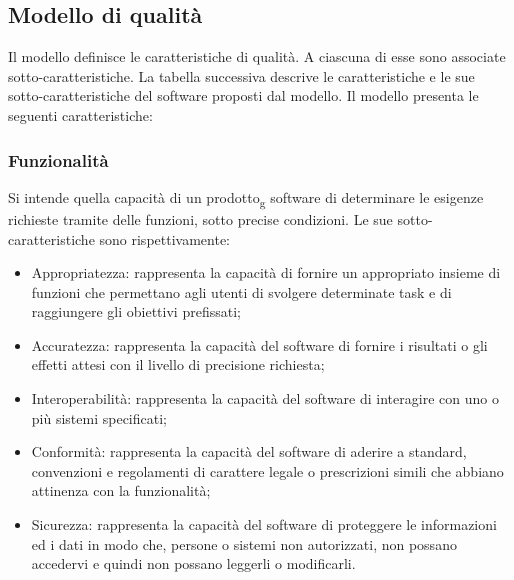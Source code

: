 \subsection{Modello di qualità}
Il modello definisce le caratteristiche di qualità. A ciascuna di esse sono associate sotto-caratteristiche. La tabella successiva descrive le caratteristiche e le sue sotto-caratteristiche del software proposti dal modello. 
Il modello presenta le seguenti caratteristiche:

\subsubsection{Funzionalità}
Si intende quella capacità di un prodotto\textsubscript{g} software di determinare le esigenze richieste tramite delle funzioni, sotto precise condizioni.
Le sue sotto-caratteristiche sono rispettivamente:
\begin{itemize}
\item Appropriatezza: rappresenta la capacità di fornire un appropriato insieme di funzioni che permettano agli utenti di svolgere determinate task e di raggiungere gli obiettivi prefissati;
\item Accuratezza: rappresenta la capacità del software di fornire i risultati o gli effetti attesi con il livello di precisione richiesta;
\item Interoperabilità: rappresenta la capacità del software di interagire con uno o più sistemi specificati;
\item Conformità: rappresenta la capacità del software di aderire a standard, convenzioni e regolamenti di carattere legale o prescrizioni simili che abbiano attinenza con la funzionalità;
\item Sicurezza: rappresenta la capacità del software di proteggere le informazioni ed i dati in modo che, persone o sistemi non autorizzati, non possano accedervi e quindi non possano leggerli o modificarli.
\end{itemize}

